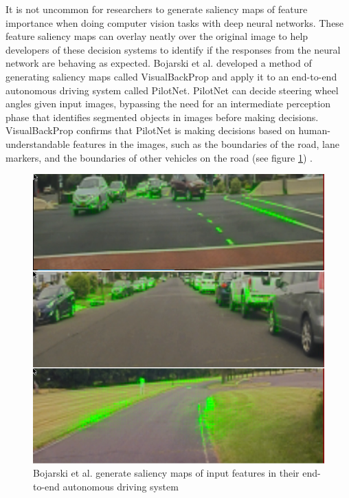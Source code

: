 It is not uncommon for researchers to generate saliency maps of feature importance when doing computer vision tasks with deep neural networks.  These feature saliency maps can overlay neatly over the original image to help developers of these decision systems to identify if the responses from the neural network are behaving as expected.  Bojarski et al. developed a method of generating saliency maps called VisualBackProp \cite{DBLP:journals/corr/BojarskiCCFJMZ16} and apply it to an end-to-end autonomous driving system called PilotNet.  PilotNet can decide steering wheel angles given input images, bypassing the need for an intermediate perception phase that identifies segmented objects in images before making decisions.  VisualBackProp confirms that PilotNet is making decisions based on human-understandable features in the images, such as the boundaries of the road, lane markers, and the boundaries of other vehicles on the road (see figure \ref{fig:bojarski2017}) \cite{Bojarski2017ExplainingHA}.

\begin{figure}
    \includegraphics[width=\textwidth]{media/bojarski2017.png}
    \caption{Bojarski et al. generate saliency maps of input features in their end-to-end autonomous driving system \cite{Bojarski2017ExplainingHA}}
    \label{fig:bojarski2017}
\end{figure}

